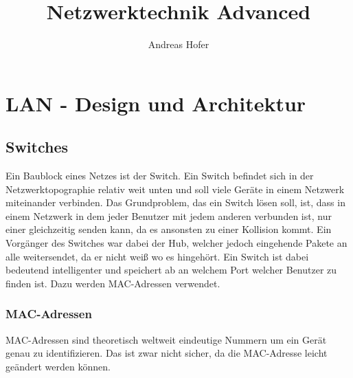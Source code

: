 \documentclass{article}
\title{\vspace{-1cm}Netzwerktechnik Advanced}
\author{Andreas Hofer}
\begin{document}
	\maketitle
	\tableofcontents
	\section{LAN - Design und Architektur}
	\subsection{Switches}
	Ein Baublock eines Netzes ist der Switch. Ein Switch befindet sich in der Netzwerktopographie relativ weit unten und soll viele Geräte in einem Netzwerk miteinander verbinden. Das Grundproblem, das ein Switch lösen soll, ist, dass in einem Netzwerk in dem jeder Benutzer mit jedem anderen verbunden ist, nur einer gleichzeitig senden kann, da es ansonsten zu einer Kollision kommt. Ein Vorgänger des Switches war dabei der Hub, welcher jedoch eingehende Pakete an alle weitersendet, da er nicht weiß wo es hingehört.
	Ein Switch ist dabei bedeutend intelligenter und speichert ab an welchem Port welcher Benutzer zu finden ist. Dazu werden MAC-Adressen verwendet.
	\subsubsection{MAC-Adressen}
	MAC-Adressen sind theoretisch weltweit eindeutige Nummern um ein Gerät genau zu identifizieren. Das ist zwar nicht sicher, da die MAC-Adresse leicht geändert werden können.
\end{document}
